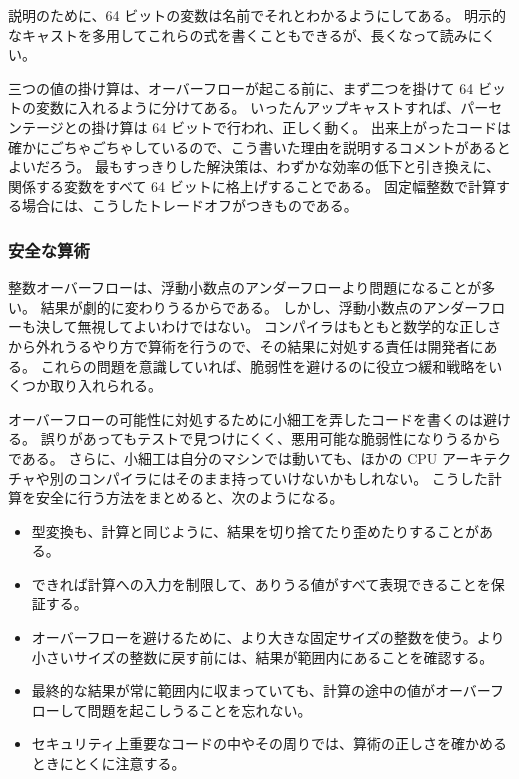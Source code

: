 \documentclass[uplatex]{jsarticle}
\def\label#1{}%
\newcounter{thm}[section]
\begin{document}
説明のために、64 ビットの変数は名前でそれとわかるようにしてある。
明示的なキャストを多用してこれらの式を書くこともできるが、長くなって読みにくい。

三つの値の掛け算は、オーバーフローが起こる前に、まず二つを掛けて 64 ビットの変数に入れるように分けてある。
いったんアップキャストすれば、パーセンテージとの掛け算は 64 ビットで行われ、正しく動く。
出来上がったコードは確かにごちゃごちゃしているので、こう書いた理由を説明するコメントがあるとよいだろう。
最もすっきりした解決策は、わずかな効率の低下と引き換えに、関係する変数をすべて 64 ビットに格上げすることである。
固定幅整数で計算する場合には、こうしたトレードオフがつきものである。

\subsubsection{安全な算術}\label{subsec:ch9-safe-arithmetic}

整数オーバーフローは、浮動小数点のアンダーフローより問題になることが多い。
結果が劇的に変わりうるからである。
しかし、浮動小数点のアンダーフローも決して無視してよいわけではない。
コンパイラはもともと数学的な正しさから外れうるやり方で算術を行うので、その結果に対処する責任は開発者にある。
これらの問題を意識していれば、脆弱性を避けるのに役立つ緩和戦略をいくつか取り入れられる。

オーバーフローの可能性に対処するために小細工を弄したコードを書くのは避ける。
誤りがあってもテストで見つけにくく、悪用可能な脆弱性になりうるからである。
さらに、小細工は自分のマシンでは動いても、ほかの CPU アーキテクチャや別のコンパイラにはそのまま持っていけないかもしれない。
こうした計算を安全に行う方法をまとめると、次のようになる。

\begin{itemize}
\item 型変換も、計算と同じように、結果を切り捨てたり歪めたりすることがある。
\item できれば計算への入力を制限して、ありうる値がすべて表現できることを保証する。
\item オーバーフローを避けるために、より大きな固定サイズの整数を使う。より小さいサイズの整数に戻す前には、結果が範囲内にあることを確認する。
\item 最終的な結果が常に範囲内に収まっていても、計算の途中の値がオーバーフローして問題を起こしうることを忘れない。
\item セキュリティ上重要なコードの中やその周りでは、算術の正しさを確かめるときにとくに注意する。
\end{itemize}
\end{document}
